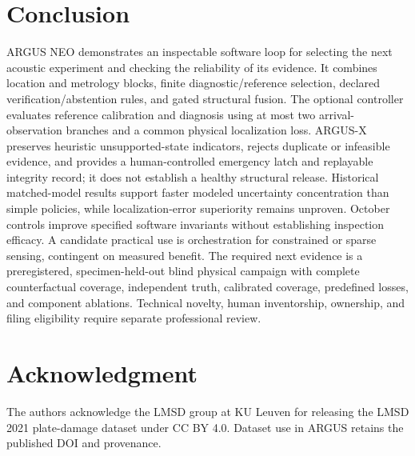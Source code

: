 \documentclass[conference]{IEEEtran}
\begin{document}






\section{Conclusion}
ARGUS NEO demonstrates an inspectable software loop for selecting the next acoustic experiment and checking the reliability of its evidence. It combines location and metrology blocks, finite diagnostic/reference selection, declared verification/abstention rules, and gated structural fusion. The optional controller evaluates reference calibration and diagnosis using at most two arrival-observation branches and a common physical localization loss. ARGUS-X preserves heuristic unsupported-state indicators, rejects duplicate or infeasible evidence, and provides a human-controlled emergency latch and replayable integrity record; it does not establish a healthy structural release. Historical matched-model results support faster modeled uncertainty concentration than simple policies, while localization-error superiority remains unproven. October controls improve specified software invariants without establishing inspection efficacy. A candidate practical use is orchestration for constrained or sparse sensing, contingent on measured benefit. The required next evidence is a preregistered, specimen-held-out blind physical campaign with complete counterfactual coverage, independent truth, calibrated coverage, predefined losses, and component ablations. Technical novelty, human inventorship, ownership, and filing eligibility require separate professional review.

\section*{Acknowledgment}
The authors acknowledge the LMSD group at KU Leuven for releasing the LMSD 2021 plate-damage dataset under CC BY 4.0. Dataset use in ARGUS retains the published DOI and provenance.

\clearpage
\appendices
\end{document}
